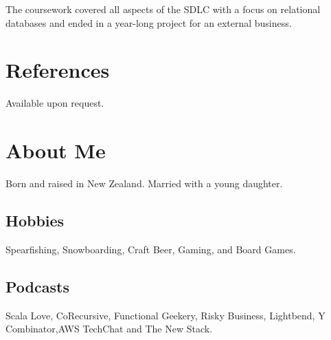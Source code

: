 \documentclass[11pt]{article}
\begin{document}
    The coursework covered all aspects of the SDLC with a focus on relational databases and ended in
    a year-long project for an external business.


    \section{References}
    \label{sec:references}
    Available upon request.


    \section{About Me}
    \label{sec:about-me}
    Born and raised in New Zealand.
    Married with a young daughter.

    \subsection{Hobbies}
    \label{subsec:hobbies}
    Spearfishing, Snowboarding, Craft Beer, Gaming, and Board Games.

    \subsection{Podcasts}
    \label{subsec:podcasts}
    Scala Love, CoRecursive, Functional Geekery, Risky Business, Lightbend, Y Combinator,AWS
    TechChat and The New Stack.
\end{document}

